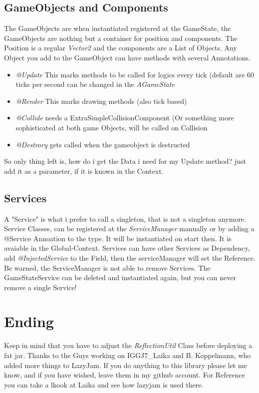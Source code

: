 \documentclass{article}
\begin{document}
\subsection{GameObjects and Components}
The GameObjects are when instantiated registered at the GameState, the GameObjects are nothing but a container for position and components.
The Position is a regular \emph{Vector2} and the components are a List of Objects.
Any Object you add to the GameObject can have methods with several Annotations. 
\begin{itemize}
\item \emph{@Update} This marks methods to be called for logics every tick (default are 60 ticks per second can be changed in the \emph{AGameState} 
\item \emph{@Render} This marks drawing methods (also tick based)
\item \emph{@Collide} needs a ExtraSimpleCollisionComponent (Or something more sophisticated at both game Objects, will be called on Collision
\item \emph{@Destrory} gets called when the gameobject is destructed
\end{itemize}
So only thing left is, how do i get the Data i need for my Update method? just add it as a parameter, if it is known in the Context.
\subsection{Services}
A "Service" is what i prefer to call a singleton, that is not a singleton anymore.
Service Classes, can be registered at the \emph{ServiceManager} manually or by adding a @Service Annoation to the type.
It will be instantiated on start then. It is avaiable in the Global-Context.
Services can have other Services as Dependency, add \emph{@InjectedService} to the Field, then the serviceManager will set the Reference.
Be warned, the ServiceManager is not able to remove Services. The GameStateService can be deleted and instantiated again, but you can never remove a single Service!
\section{Ending}
Keep in mind that you have to adjust the \emph{ReflectionUtil} Class before deploying a fat jar.
Thanks to the Guys working on IGGJ7\_Laika and B. Koppelmann, who added more things to LazyJam. If you do anything to this library please let me know, and if you have wished, leave them in my github account.
For Reference you can take a lkook at Laika and see how lazyjam is used there.
 
\end{document}
